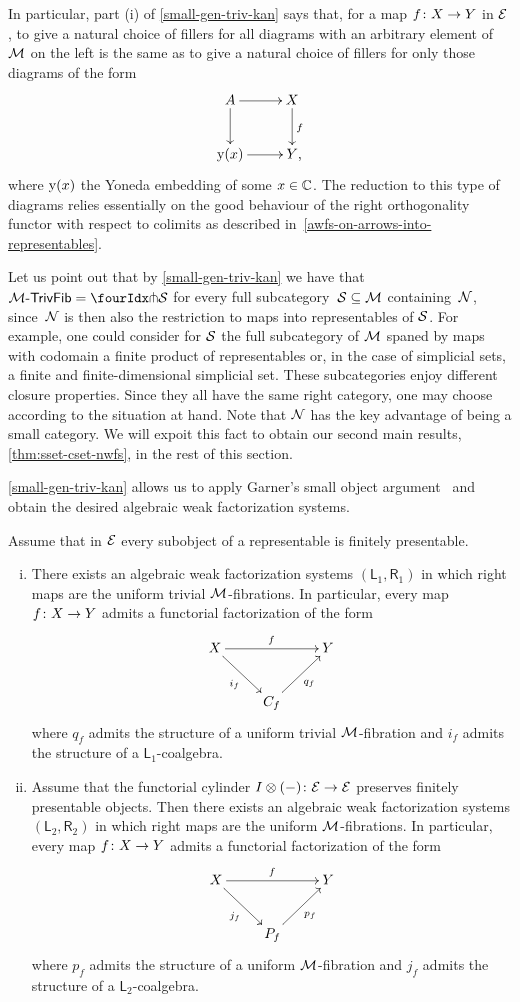 \documentclass[reqno,10pt,a4paper,oneside,draft]{amsart}
\begin{document}
In particular, part (i) of \cref{small-gen-triv-kan} says that, for a map $f \co X \to Y$ in $\catE$, to give a natural choice of fillers for all diagrams with an arbitrary element of $\cal{M}$ on the left is the same as to give a natural choice of fillers for only those diagrams of the form
\[
\xymatrix{
  A
  \ar[r]
  \ar[d]
&
  X
  \ar[d]^f
\\
  \yon(x)
  \ar[r]
&
  Y
\rlap{,}}
\]
where $\yon(x)$ the Yoneda embedding of some $x \in \catC$.
The reduction to this type of diagrams relies essentially on the good behaviour of the right orthogonality functor with respect to colimits as described in~\cref{awfs-on-arrows-into-representables}.

Let us point out that by \cref{small-gen-triv-kan} we have that $\TrivFib{\cal{M}} = \liftr{\cal{S}}$ for every full subcategory~$\cal{S} \subseteq \cal{M}$ containing~$\cal{N}$, since~$\cal{N}$ is then also the restriction to maps into representables of $\cal{S}$.
For example, one could consider for $\cal{S}$ the full subcategory of $\cal{M}$ spaned by maps with codomain a finite product of representables or, in the case of simplicial sets, a finite and finite-dimensional simplicial set.
These subcategories enjoy different closure properties.
Since they all have the same right category, one may choose according to the situation at hand.
Note that $\cal{N}$ has the key advantage of being a small category.
We will expoit this fact to obtain our second main results, \cref{thm:sset-cset-nwfs}, in the rest of this section.

\cref{small-gen-triv-kan} allows us to apply Garner's small object argument~\cite{garner:small-object-argument} and obtain the desired algebraic weak factorization systems.

\begin{theorem} \label{thm:sset-cset-nwfs}
Assume that in $\cal{E}$ every subobject of a representable is finitely presentable.
\begin{enumerate}[(i)]
\item There exists an algebraic weak factorization systems $(\mathsf{L}_1, \mathsf{R}_1)$ in which right maps are the uniform trivial $\cal{M}$-fibrations.
In particular, every map $f \co X \to Y$ admits a functorial factorization of the form
\[
\xymatrix{
  X
  \ar[rr]^{f}
  \ar[dr]_{i_f}
&&
  Y
\\&
  C_f
  \ar[ur]_{q_f}
}
\]
where $q_f$ admits the structure of a uniform trivial $\cal{M}$-fibration and $i_f$ admits the structure of a $\mathsf{L}_1$-coalgebra.
\item Assume that the functorial cylinder $\interval \otimes (-) \co \cal{E} \to \cal{E}$ preserves finitely presentable objects.
Then there exists an algebraic weak factorization systems $(\mathsf{L}_2, \mathsf{R}_2)$ in which right maps are the uniform $\cal{M}$-fibrations.
In particular, every map $f \co X \to Y$ admits a functorial factorization of the form
\[
\xymatrix{
  X
  \ar[rr]^{f}
  \ar[dr]_{j_f}
&&
  Y
\\&
  P_f
  \ar[ur]_{p_f}
}
\]
where $p_f$ admits the structure of a uniform $\cal{M}$-fibration and $j_f$ admits the structure of a $\mathsf{L}_2$-coalgebra.
\end{enumerate}
\end{theorem}
\end{document}
